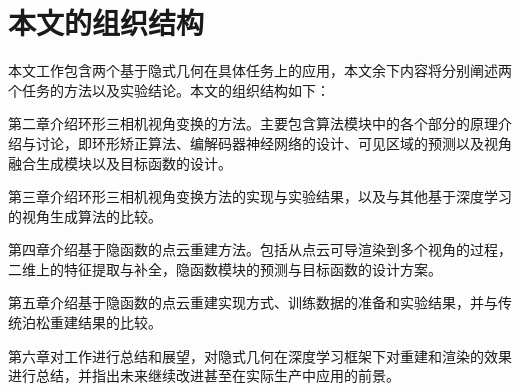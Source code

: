 \section{本文的组织结构}
本文工作包含两个基于隐式几何在具体任务上的应用，本文余下内容将分别阐述两个任务的方法以及实验结论。本文的组织结构如下：

第二章介绍环形三相机视角变换的方法。主要包含算法模块中的各个部分的原理介绍与讨论，即环形矫正算法、编解码器神经网络的设计、可见区域的预测以及视角融合生成模块以及目标函数的设计。

第三章介绍环形三相机视角变换方法的实现与实验结果，以及与其他基于深度学习的视角生成算法的比较。

第四章介绍基于隐函数的点云重建方法。包括从点云可导渲染到多个视角的过程，二维上的特征提取与补全，隐函数模块的预测与目标函数的设计方案。

第五章介绍基于隐函数的点云重建实现方式、训练数据的准备和实验结果，并与传统泊松重建结果的比较。

第六章对工作进行总结和展望，对隐式几何在深度学习框架下对重建和渲染的效果进行总结，并指出未来继续改进甚至在实际生产中应用的前景。